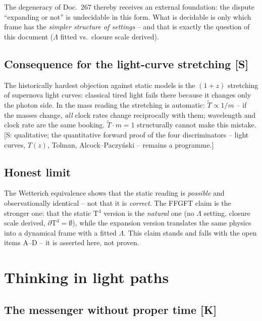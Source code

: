 \documentclass[11pt]{report}
\begin{document}
The degeneracy of Doc.~267 thereby receives an external foundation:
the dispute \enquote{expanding or not} is undecidable in this form.
What is decidable is only which frame has the \emph{simpler
structure of settings} -- and that is exactly the question of this
document ($\Lambda$ fitted vs.\ closure scale derived).

\section{Consequence for the light-curve stretching [S]}

The historically hardest objection against static models is the
$(1+z)$ stretching of supernova light curves: classical tired
light fails there because it changes only the photon side. In the
mass reading the stretching is automatic:
$\tilde T \propto 1/m$ -- if the masses change, \emph{all} clock
rates change reciprocally with them; wavelength and clock rate are
the same booking. $\tilde T \cdot m = 1$ structurally cannot make
this mistake. [S: qualitative; the quantitative forward proof of
the four discriminators -- light curves, $T(z)$, Tolman,
Alcock--Paczyński -- remains a programme.]

\section{Honest limit}

The Wetterich equivalence shows that the static reading is
\emph{possible} and observationally identical -- not that it is
\emph{correct}. The FFGFT claim is the stronger one: that the
static T$^4$ version is the \emph{natural} one (no $\Lambda$
setting, closure scale derived, $\partial\text{T}^4 = \emptyset$),
while the expansion version translates the same physics into a
dynamical frame with a fitted $\Lambda$. This claim stands and
falls with the open items A--D -- it is asserted here, not proven.

\chapter{Thinking in light paths}

\section{The messenger without proper time [K]}
\end{document}
